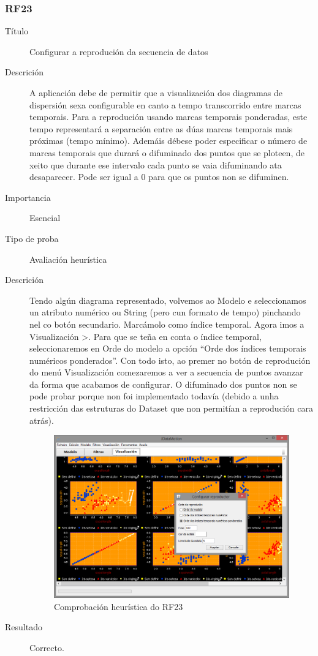 \subsubsection*{RF23}
\begin{description}
\item[Título] \hfill
Configurar a reprodución da secuencia de datos
\item[Descrición] \hfill
A aplicación debe de permitir que a visualización dos diagramas de dispersión sexa configurable en canto a tempo transcorrido entre marcas temporais. Para a reprodución usando marcas temporais ponderadas, este tempo representará a separación entre as dúas marcas temporais mais próximas (tempo mínimo). Ademáis débese poder especificar o número de marcas temporais que durará o difuminado dos puntos que se ploteen, de xeito que durante ese intervalo cada punto se vaia difuminando ata desaparecer. Pode ser igual a 0 para que os puntos non se difuminen.
\item[Importancia] \hfill
Esencial
\item[Tipo de proba] \hfill
Avaliación heurística
\item[Descrición]
Tendo algún diagrama representado, volvemos ao Modelo e seleccionamos un atributo numérico ou String (pero cun formato de tempo) pinchando nel co botón secundario. Marcámolo como índice temporal. Agora imos a Visualización \textgreater{}. Para que se teña en conta o índice temporal, seleccionaremos en Orde do modelo a opción ``Orde dos índices temporais numéricos ponderados''. Con todo isto, ao premer no botón de reprodución do menú Visualización comezaremos a ver a secuencia de puntos avanzar da forma que acabamos de configurar. O difuminado dos puntos non se pode probar porque non foi implementado todavía (debido a unha restricción das estruturas do Dataset que non permitían a reprodución cara atrás).
\begin{figure}
\centering
\includegraphics[width=\textwidth,height=\textheight,keepaspectratio]{figuras/RF23}
\caption{Comprobación heurística do RF23}
\label{RF23}
\end{figure}
\item[Resultado]
Correcto.
\end{description}

